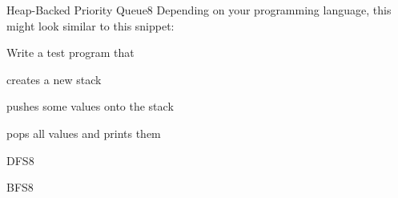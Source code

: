 \documentclass[a4paper]{article}
\begin{document}
\header

\begin{problem}{Heap-Backed Priority Queue}{8}
Depending on your programming language, this might look similar to this snippet:
\begin{acode}
\end{acode}

Write a test program that
\begin{compactitem}
 \item creates a new stack
 \item pushes some values onto the stack
 \item pops all values and prints them
\end{compactitem}
\end{problem}

\begin{problem}{DFS}{8}
\end{problem}

\begin{problem}{BFS}{8}

\end{problem}

\end{document}
